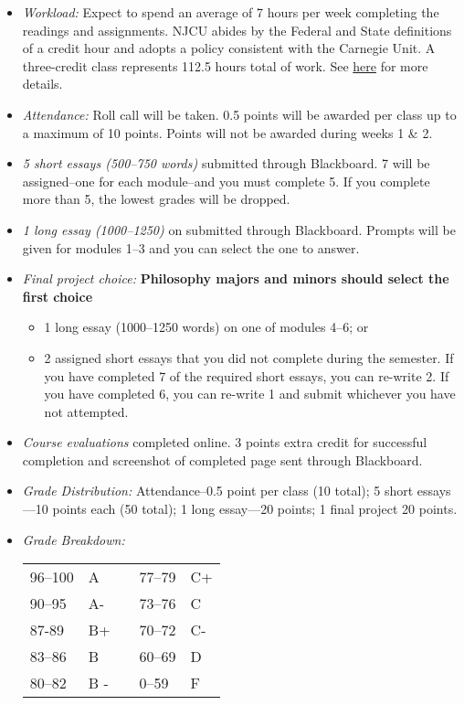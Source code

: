 \documentclass[article,oneside]{memoir}
\begin{document}
\begin{itemize}
\item \textit{Workload:} Expect to spend an average of 7 hours per week completing the readings and assignments. NJCU abides by the Federal and State definitions of a credit hour and adopts a policy consistent with the Carnegie Unit. A three-credit class represents 112.5 hours total of work. See \href{http://scottoconnor.org/resources/Credit.pdf}{here} for more details.

\item \textit{Attendance:} Roll call will be taken. 0.5 points will be awarded per class up to a maximum of 10 points. Points will not be awarded during weeks 1 \& 2.  

\item \textit{5 short essays (500--750 words)} submitted through Blackboard. 7 will be assigned--one for each module--and you must complete 5. If you complete more than 5, the lowest grades will be dropped.  


\item \textit{1 long essay (1000--1250)} on submitted through Blackboard. Prompts will be given for modules 1--3 and you can select the one to answer.

\item \textit{Final project choice:}  \textbf{Philosophy majors and minors should select the first choice}  

\begin{itemize}
\item 1 long essay (1000--1250 words) on one of modules 4--6; or
\item 2 assigned short essays that you did not complete during the semester. If you have completed 7 of the required short essays, you can re-write 2. If you have completed 6, you can re-write 1 and submit whichever you have not attempted. 
\end{itemize}

\item \textit{Course evaluations} completed online. 3 points extra credit for successful completion and screenshot of completed page sent through Blackboard. 

\item \textit{Grade Distribution:} Attendance--0.5 point per class (10 total); 5 short essays---10 points each (50 total); 1 long essay---20 points; 1 final project 
20 points. 


\item \textit{Grade Breakdown:}

 \begin{tabular}{ | l | l | p{2cm} | l | l | }
    \hline 
96--100 & A  & &  77--79 &  C+ \\  
90--95 & A- & &  73--76 & C \\
87-89 & B+ &  &  70--72 & C- \\ 
83--86 & B  & &  60--69 & D\\
80--82 & B - & & 0--59 & F\\ \hline
    \end{tabular}


\end{itemize}
\end{document}
